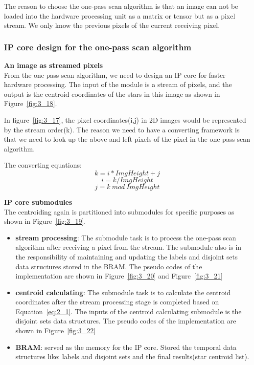 \noindent The reason to choose the one-pass scan algorithm is that an image can not be loaded into the hardware processing unit as a matrix or tensor but as a pixel stream. We only know the previous pixels of the current receiving pixel.

\subsubsection{IP core design for the one-pass scan algorithm}

\textbf{An image as streamed pixels} \\
\noindent From the one-pass scan algorithm, we need to design an IP core for faster hardware processing. The input of the module is a stream of pixels, and the output is the centroid coordinates of the stars in this image as shown in Figure~\ref{fig:3_18}.


\noindent In figure~\ref{fig:3_17}, the pixel coordinates(i,j) in 2D images would be represented by the stream order(k). The reason we need to have a converting framework is that we need to look up the above and left pixels of the pixel in the one-pass scan algorithm. \\
	

\noindent The converting equations:
	$$k = i*ImgHeight + j$$
	$$i = k / ImgHeight$$
	$$j = k\ mod\ ImgHeight$$

\textbf{IP core submodules} \\

\noindent The centroiding again is partitioned into submodules for specific purposes as shown in Figure~\ref{fig:3_19}.


\begin{itemize}
	\item \textbf{stream processing}: The submodule task is to process the one-pass scan algorithm after receiving a pixel from the stream. The submodule also is in the responsibility of maintaining and updating the labels and disjoint sets data structures stored in the BRAM. The pseudo codes of the implementation are shown in Figure~\ref{fig:3_20} and Figure~\ref{fig:3_21}
	\item \textbf{centroid calculating}: The submodule task is to calculate the centroid coordinates after the stream processing stage is completed based on Equation~\ref{eq:2_1}. The inputs of the centroid calculating submodule is the disjoint sets data structures. The pseudo codes of the implementation are shown in Figure~\ref{fig:3_22}
	\item \textbf{BRAM}: served as the memory for the IP core. Stored the temporal data structures like: labels and disjoint sets and the final results(star centroid list).
\end{itemize}

